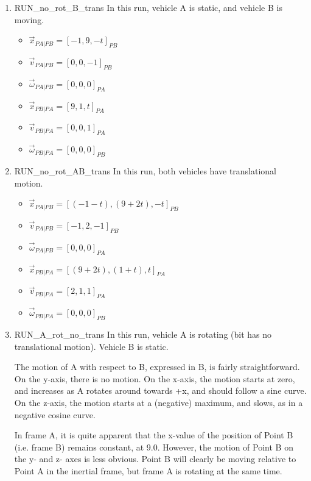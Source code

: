 \begin{description}
\begin{enumerate}
 \item RUN\_no\_rot\_B\_trans \newline
 In this run, vehicle A is static, and vehicle B is moving.
 \begin{itemize}
    \item $\vec x_{PA|PB} = [-1 , 9 , -t]_{PB}$
    \item $\vec v_{PA|PB} = [0 , 0 , -1]_{PB}$
    \item $\vec \omega_{PA|PB} = [0 , 0 , 0]_{PA}$
    \item $\vec x_{PB|PA} = [9 , 1 , t]_{PA}$
    \item $\vec v_{PB|PA} = [0 , 0 , 1]_{PA}$
    \item $\vec \omega_{PB|PA} = [0 , 0 , 0]_{PB}$
   \end{itemize}
 \item RUN\_no\_rot\_AB\_trans \newline
 In this run, both vehicles have translational motion.
   \begin{itemize}
    \item $\vec x_{PA|PB} = [(-1 - t) , (9 + 2t) , -t]_{PB}$
    \item $\vec v_{PA|PB} = [-1 , 2 , -1]_{PB}$
    \item $\vec \omega_{PA|PB} = [0 , 0 , 0]_{PA}$
    \item $\vec x_{PB|PA} = [(9 + 2t) , (1 + t) , t]_{PA}$
    \item $\vec v_{PB|PA} = [2 , 1 , 1]_{PA}$
    \item $\vec \omega_{PB|PA} = [0 , 0 , 0]_{PB}$
   \end{itemize}
 \item RUN\_A\_rot\_no\_trans \newline
  In this run, vehicle A is rotating (bit has no translational motion).  Vehicle B is static.
  
  The motion of A with respect to B, expressed in B, is fairly
  straightforward.  On the y-axis, there is no motion.  On the x-axis, the
  motion starts at zero, and increases as A rotates around towards +x, and
  should follow a sine curve.  On
  the z-axis, the motion starts at a (negative) maximum, and slows, as in a
  negative cosine curve.
  
  In frame A, it is quite apparent that the x-value of the position of
  Point B (i.e. frame B) remains constant, at 9.0.  However, the motion of
  Point B on the y- and z- axes is less obvious.  Point B will clearly be moving
  relative to Point A in the inertial frame, but frame A is rotating at the
  same time.
  

\end{enumerate}
\end{description}
